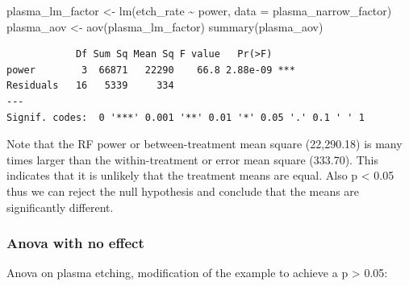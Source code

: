 \documentclass[
]{book}
\newenvironment{Shaded}{\begin{snugshade}}{\end{snugshade}}
\newcommand{\AttributeTok}[1]{\textcolor[rgb]{0.77,0.63,0.00}{#1}}
\newcommand{\FunctionTok}[1]{\textcolor[rgb]{0.00,0.00,0.00}{#1}}
\newcommand{\NormalTok}[1]{#1}
\newcommand{\OtherTok}[1]{\textcolor[rgb]{0.56,0.35,0.01}{#1}}
\newcommand{\SpecialCharTok}[1]{\textcolor[rgb]{0.00,0.00,0.00}{#1}}
\newcommand{\StringTok}[1]{\textcolor[rgb]{0.31,0.60,0.02}{#1}}
\begin{document}
\begin{Shaded}
\begin{Highlighting}[]
\NormalTok{plasma\_lm\_factor }\OtherTok{\textless{}{-}} \FunctionTok{lm}\NormalTok{(etch\_rate }\SpecialCharTok{\textasciitilde{}}\NormalTok{ power, }\AttributeTok{data =}\NormalTok{ plasma\_narrow\_factor)}
\NormalTok{plasma\_aov }\OtherTok{\textless{}{-}} \FunctionTok{aov}\NormalTok{(plasma\_lm\_factor)}
\FunctionTok{summary}\NormalTok{(plasma\_aov)}
\end{Highlighting}
\end{Shaded}

\begin{verbatim}
            Df Sum Sq Mean Sq F value   Pr(>F)    
power        3  66871   22290    66.8 2.88e-09 ***
Residuals   16   5339     334                     
---
Signif. codes:  0 '***' 0.001 '**' 0.01 '*' 0.05 '.' 0.1 ' ' 1
\end{verbatim}

Note that the RF power or between-treatment mean square (22,290.18) is many times larger than the within-treatment or error mean square (333.70). This indicates that it is unlikely that the treatment means are equal.
Also p \textless{} 0.05 thus we can reject the null hypothesis and conclude that the means are significantly different.

\hypertarget{anova-with-no-effect}{%
\subsubsection{Anova with no effect}\label{anova-with-no-effect}}

Anova on plasma etching, modification of the example to achieve a p \textgreater{} 0.05:

\begin{Shaded}
\end{Shaded}
\end{document}
